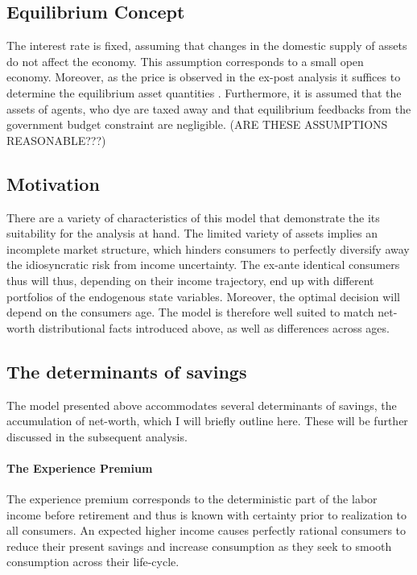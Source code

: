 \documentclass[a4paper,12pt]{article}
\begin{document}
\subsection{Equilibrium Concept}
The interest rate is fixed, assuming that changes in the domestic supply of assets do not affect the economy. This assumption corresponds to a small open economy. Moreover, as the price is observed in the ex-post analysis it suffices to determine the equilibrium asset quantities \citep{hintermaier2011}. Furthermore, it is assumed that the assets of agents, who dye are taxed away and that equilibrium feedbacks from the government budget constraint are negligible. (ARE THESE ASSUMPTIONS REASONABLE???)  

\subsection{Motivation}
There are a variety of characteristics of this model that demonstrate the its suitability for the analysis at hand. The limited variety of assets implies an incomplete market structure, which hinders consumers to perfectly diversify away the idiosyncratic risk from income uncertainty. The ex-ante identical consumers thus will thus, depending on their income trajectory, end up with different portfolios of the endogenous state variables. Moreover, the optimal decision will depend on the consumers age. The model is therefore well suited to match  net-worth distributional facts  introduced above, as well as differences across ages.

\subsection{The determinants of savings}
\label{determinants}
The model presented above accommodates several determinants of savings, the accumulation of net-worth, which I will briefly outline here. These will be further discussed in the subsequent analysis. 

\paragraph{The Experience Premium} The experience premium corresponds to the deterministic part of the labor income before retirement and thus is known with certainty prior to realization to all consumers. An expected higher income causes perfectly rational consumers to reduce their present savings and increase consumption as they seek to smooth consumption across their life-cycle. 
\end{document}
